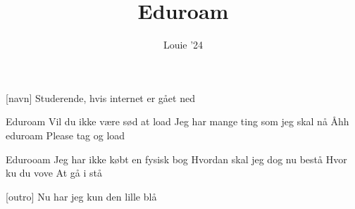 \documentclass[a4paper,11pt]{article}
\title{Eduroam}
\author{Louie '24}
\begin{document}
\maketitle

\begin{roles}
[navn] Studerende, hvis internet er gået ned
\end{roles}


\begin{song}
   Eduroam
  Vil du ikke være sød at load
  Jeg har mange ting som jeg skal nå
  Åhh eduroam
  Please tag og load

  Edurooam
  Jeg har ikke købt en fysisk bog
  Hvordan skal jeg dog nu bestå
  Hvor ku du vove
  At gå i stå

  [outro] Nu har jeg kun den lille blå
\end{song}
\end{document}
